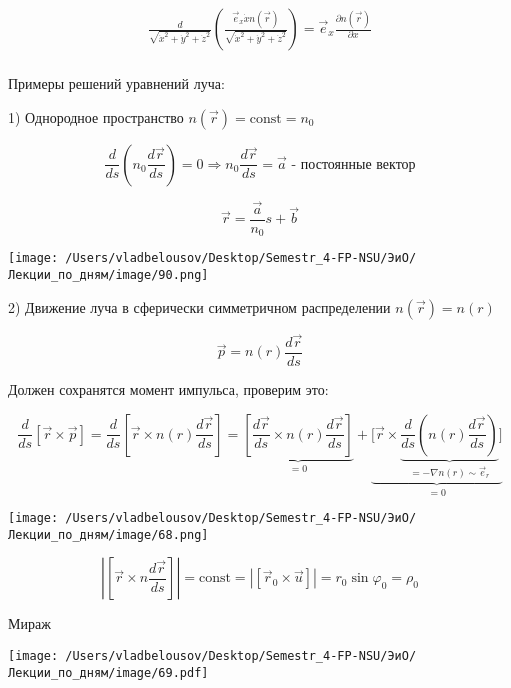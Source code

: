 \documentclass[12pt, a4paper]{report}
\begin{document}
\[ \begin{array}{l|}
    \displaystyle \frac{d}{\sqrt{\dot{ x } ^2 + \dot{ y } ^2 + \dot{ z } ^2 }} \left(  \frac{\vec{e } _x \dot{ x }  n(\vec{r } )}{\sqrt{\dot{ x } ^2 + \dot{ y } ^2 + \dot{ z } ^2 }}  \right) =  \vec{e } _x \frac{ \partial  n (\vec{r } )}{\partial  x } \\
\end{array}   \] 

Примеры решений уравнений луча: 

1) Однородное пространство \( n(\vec{r } ) = \mathrm{const} = n_0  \) 

\[ \frac{d}{ds } \left( n_0 \frac{ d \vec{r } }{d s }     \right) = 0 \Rightarrow n_0 \frac{d \vec{r } }{ds} = \vec{a } \text{ - постоянные вектор}  \] 

\[ \vec{r } = \frac{ \vec{a } }{ n_0 }s + \vec{b }   \] 

\begin{center}
    \texttt{[image: /Users/vladbelousov/Desktop/Semestr\_4-FP-NSU/ЭиО/Лекции\_по\_дням/image/90.png]}
\end{center}

2) Движение луча в сферически симметричном распределении \( n(\vec{r } ) = n (r ) \) 

\[ \vec{p }  = n ( r ) \frac{ d \vec{r } }{ds}   \] 

Должен сохранятся момент импульса, проверим это:

\[ \frac{d}{ds } [\vec{r } \times  \vec{p } ] = \frac{d}{ds }  \left[ \vec{r } \times  n(r )\frac{d \vec{r } }{d s }  \right] = \underbrace{\left[  \frac{ d \vec{r } }{ ds }\times  n(r ) \frac{ d \vec{r } }{ds}   \right]}_{ = 0} + \underbrace{\bigg[ \vec{r } \times  \underbrace{\frac{d}{ds } \left( n(r ) \frac{ d \vec{r } }{ds}  \right)}_{= - \nabla n(r ) \sim \vec{e } _r} \bigg]}_{= 0}\] 

\begin{center}
    \texttt{[image: /Users/vladbelousov/Desktop/Semestr\_4-FP-NSU/ЭиО/Лекции\_по\_дням/image/68.png]}
\end{center}

\[ \left\lvert [\vec{r } \times  n \frac{ d \vec{r } }{ds } ]  \right\rvert= \mathrm{const }  = \left\lvert [ \vec{r } _0 \times  \vec{u} ] \right\rvert = r_0 \sin \varphi_0 = \rho_0  \] 

Мираж

\begin{center}
    \texttt{[image: /Users/vladbelousov/Desktop/Semestr\_4-FP-NSU/ЭиО/Лекции\_по\_дням/image/69.pdf]}
\end{center}
\end{document}
